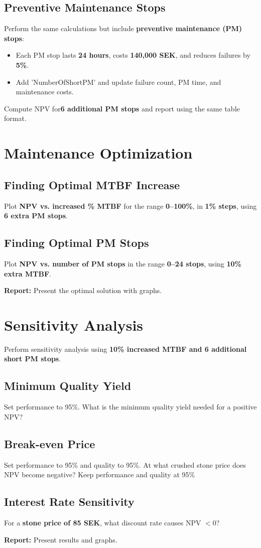 \documentclass[a4paper,12pt]{exam}
\begin{document}
\subsection{Preventive Maintenance Stops}
Perform the same calculations but include \textbf{preventive maintenance (PM) stops}:
\begin{itemize}
    \item Each PM stop lasts \textbf{24 hours}, costs \textbf{140,000 SEK}, and reduces failures by \textbf{5\%}.
    \item Add 'NumberOfShortPM' and update failure count, PM time, and maintenance costs.
\end{itemize}
Compute NPV for\textbf{6 additional PM stops} and report using the same table format.

\section{Maintenance Optimization}
\subsection{Finding Optimal MTBF Increase}
Plot \textbf{NPV vs. increased \% MTBF} for the range \textbf{0–100\%}, in \textbf{1\% steps}, using \textbf{6 extra PM stops}.

\subsection{Finding Optimal PM Stops}
Plot \textbf{NPV vs. number of PM stops} in the range \textbf{0–24 stops}, using \textbf{10\% extra MTBF}.

\textbf{Report:} Present the optimal solution with graphs.

\section{Sensitivity Analysis}
Perform sensitivity analysis using \textbf{10\% increased MTBF and 6 additional short PM
stops}.

\subsection{Minimum Quality Yield}
Set performance to 95\%. What is the minimum quality yield needed for a positive NPV? 

\subsection{Break-even Price}
Set performance to 95\% and quality to 95\%. At what crushed stone price does NPV become negative? Keep performance and quality at 95\%

\subsection{Interest Rate Sensitivity}
For a \textbf{stone price of 85 SEK}, what discount rate causes NPV $<0$?

\textbf{Report:} Present results and graphs.
\end{document}
